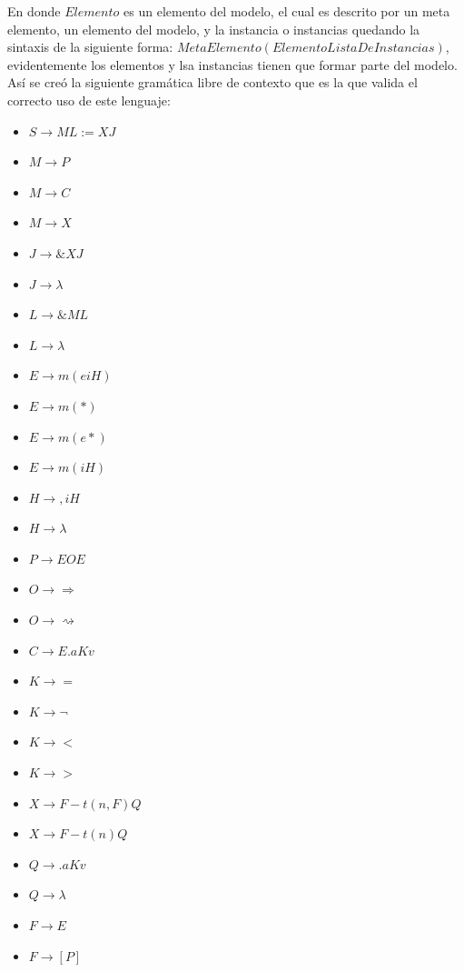 En donde $Elemento$ es un elemento del modelo, el cual es descrito por un meta elemento, un elemento del modelo, y la instancia o instancias quedando la sintaxis de la siguiente forma: $MetaElemento(Elemento{ListaDeInstancias})$, evidentemente los elementos y lsa instancias tienen que formar parte del modelo. As\'i se cre\'o la siguiente gram\'atica libre de contexto que es la que valida el correcto uso de este lenguaje:
\begin{itemize}
\item $S \rightarrow ML:=XJ$
\item $M \rightarrow P$
\item $M \rightarrow C$
\item $M \rightarrow X$
\item $J \rightarrow \&XJ$
\item $J \rightarrow \lambda$
\item $L \rightarrow \&ML$
\item $L \rightarrow \lambda$
\item $E \rightarrow m(e{iH})$
\item $E \rightarrow m(*)$
\item $E \rightarrow m(e{*})$
\item $E \rightarrow m(iH)$
\item $H \rightarrow ,iH$
\item $H \rightarrow \lambda$
\item $P \rightarrow EOE$
\item $O \rightarrow \Rightarrow$
\item $O \rightarrow \rightsquigarrow$
\item $C \rightarrow E.aKv$
\item $K \rightarrow =$
\item $K \rightarrow ¬$
\item $K \rightarrow <$
\item $K \rightarrow >$
\item $X \rightarrow F-t(n,F)Q$
\item $X \rightarrow F-t(n)Q$
\item $Q \rightarrow .aKv$
\item $Q \rightarrow \lambda$
\item $F \rightarrow E$
\item $F \rightarrow [P]$
\end{itemize}


